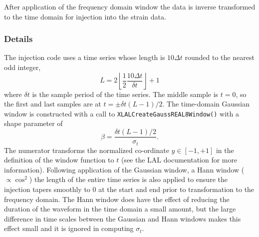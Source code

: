 \documentclass[10pt]{article}
\begin{document}
After application of the frequency domain window the data is inverse
transformed to the time domain for injection into the strain data.


\subsubsection{Details}


The injection code uses a time series whose length is \(10 \Delta t\)
rounded to the nearest odd integer,
\begin{equation}
L
   = 2 \left\lfloor \frac{1}{2} \frac{10 \Delta t}{\delta t} \right\rfloor
   + 1
\end{equation}
where \(\delta t\) is the sample period of the time series.  The middle
sample is \(t = 0\), so the first and last samples are at \(t = \pm \delta
t (L - 1) / 2\).  The time-domain Gaussian window is constructed with a
call to \texttt{XLALCreateGaussREAL8Window()} with a shape parameter of
\begin{equation}
\beta
   = \frac{\delta t (L - 1) / 2}{\sigma_{t}}.
\end{equation}
The numerator transforms the normalized co-ordinate \(y \in [-1, +1]\) in
the definition of the window function to \(t\) (see the LAL documentation
for more information).  Following application of the Gaussian window, a
Hann window (\(\propto \cos^{2}\)) the length of the entire time series is
also applied to ensure the injection tapers smoothly to 0 at the start and
end prior to transformation to the frequency domain.  The Hann window does
have the effect of reducing the duration of the waveform in the time domain
a small amount, but the large difference in time scales between the
Gaussian and Hann windows makes this effect small and it is ignored in
computing \(\sigma_{t}\).
\end{document}
